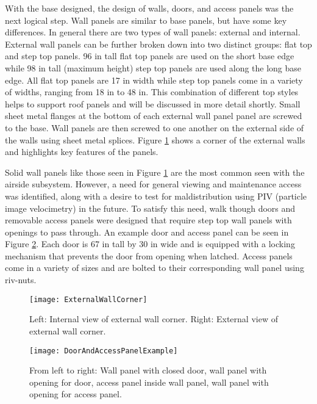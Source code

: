 With the base designed, the design of walls, doors, and access panels was the next logical step. Wall panels are similar to base panels, but have some key differences. In general there are two types of wall panels: external and internal. External wall panels can be further broken down into two distinct groups: flat top and step top panels. 96 in tall flat top panels are used on the short base edge while 98 in tall (maximum height) step top panels are used along the long base edge. All flat top panels are 17 in width while step top panels come in a variety of widths, ranging from 18 in to 48 in. This combination of different top styles helps to support roof panels and will be discussed in more detail shortly. Small sheet metal flanges at the bottom of each external wall panel panel are screwed to the base. Wall panels are then screwed to one another on the external side of the walls using sheet metal splices. Figure \ref{fig:ExternalWallCorner} shows a corner of the external walls and highlights key features of the panels.

Solid wall panels like those seen in Figure \ref{fig:ExternalWallCorner} are the most common seen with the airside subsystem. However, a need for general viewing and maintenance access was identified, along with a desire to test for maldistribution using PIV (particle image velocimetry) in the future. To satisfy this need, walk though doors and removable access panels were designed that require step top wall panels with openings to pass through. An example door and access panel can be seen in Figure \ref{fig:DoorAndAccessPanelExample}. Each door is 67 in tall by 30 in wide and is equipped with a locking mechanism that prevents the door from opening when latched. Access panels come in a variety of sizes and are bolted to their corresponding wall panel using riv-nuts. 

\begin{figure}
\centering
\texttt{[image: ExternalWallCorner]}
\caption{Left: Internal view of external wall corner. Right: External view of external wall corner.}
\label{fig:ExternalWallCorner}
\end{figure}

\begin{figure}
\centering
\texttt{[image: DoorAndAccessPanelExample]}
\caption{From left to right: Wall panel with closed door, wall panel with opening for door, access panel inside wall panel, wall panel with opening for access panel.}
\label{fig:DoorAndAccessPanelExample}
\end{figure}

